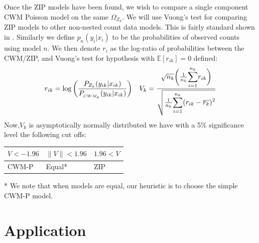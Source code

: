 \documentclass[11pt,letterpaper]{article}
\numberwithin{equation}{section}
\numberwithin{equation}{section}
\numberwithin{equation}{section}
\begin{document}
Once the ZIP models have been found, we wish to compare a single component CWM Poisson model on the same $\Omega_{Z_k}$. We will use Vuong's test for comparing ZIP models to other non-nested count data models. This is fairly standard shown in \cite{EzzahidEuro}. %
Similarly we define $p_n(y_{i}|x_{i})$ to be the probabilities of observed counts using model $n$. We then denote $r_i$ as the log-ratio of probabilities between the CWM/ZIP, and   Vuong's test for hypothesis with $\mathbb{E} [r_{ik}] = 0 $ defined: 
\begin{align*}
 r_{ik} = \log \bigg( \frac{P_{Z_k}(y_{ik}|x_{ik})}{P_{ _{CWM_k}}(y_{ik}|x_{ik})} \bigg) && 
V_k = \frac{  \sqrt{n_k}  \bigg(\frac{1}{n_k} \mathlarger{  \sum_{i=1}^{n_k} } r_{ik}    \bigg)    }{\sqrt{ \frac{1}{n_k}  \mathlarger{  \sum_{i=1}^{n_k} ( r_{ik} -    \overline{r_k} )^2  }}} 
\end{align*}
Now,$V_k$ is asymptotically normally distributed we have with a 5\% significance level the following cut offs:
\begin{center}
\begin{tabular}{lll}
\hline
$ V < -1.96$ & $ \|V \|  < 1.96$ & $ 1.96 < V $ \\
\hline
CWM-P             & Equal*           & ZIP             \\
\hline
\end{tabular}
\end{center}
* We note that when models are equal, our heuristic is to choose the simple CWM-P model.%

\section{Application}
\end{document}
